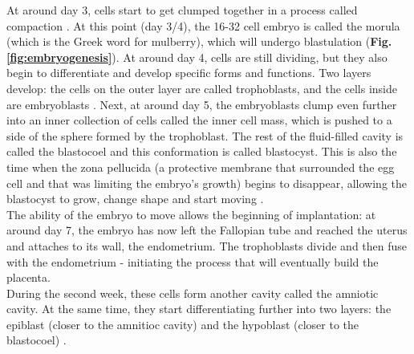At around day 3, cells start to get clumped together in a process called compaction \cite{iwata2014analysis}.
At this point (day 3/4), the 16-32 cell embryo is called the morula (which is the Greek word for mulberry), which will undergo blastulation \cite{wong2010non} (\textbf{Fig. \ref{fig:embryogenesis}}).
At around day 4, cells are still dividing, but they also begin to differentiate and develop specific forms and functions.
Two layers develop: the cells on the outer layer are called trophoblasts, and the cells inside are embryoblasts \cite{petropoulos2016single, niakan2013analysis}. 
Next, at around day 5, the embryoblasts clump even further into an inner collection of cells called the inner cell mass, which is pushed to a side of the sphere formed by the trophoblast.
The rest of the fluid-filled cavity is called the blastocoel and this conformation is called blastocyst.
This is also the time when the zona pellucida (a protective membrane that surrounded the egg cell and that was limiting the embryo's growth) begins to disappear, allowing the blastocyst to grow, change shape and start moving \cite{larsen2001human}.\\

The ability of the embryo to move allows the beginning of implantation: at around day 7, the embryo has now left the Fallopian tube and reached the uterus and attaches to its wall, the endometrium.
The trophoblasts divide and then fuse with the endometrium - initiating the process that will eventually build the placenta.\\

During the second week, these cells form another cavity called the amniotic cavity. 
At the same time, they start differentiating further into two layers: the epiblast (closer to the amnitioc cavity) and the hypoblast (closer to the blastocoel) \cite{khan2015human}. 

